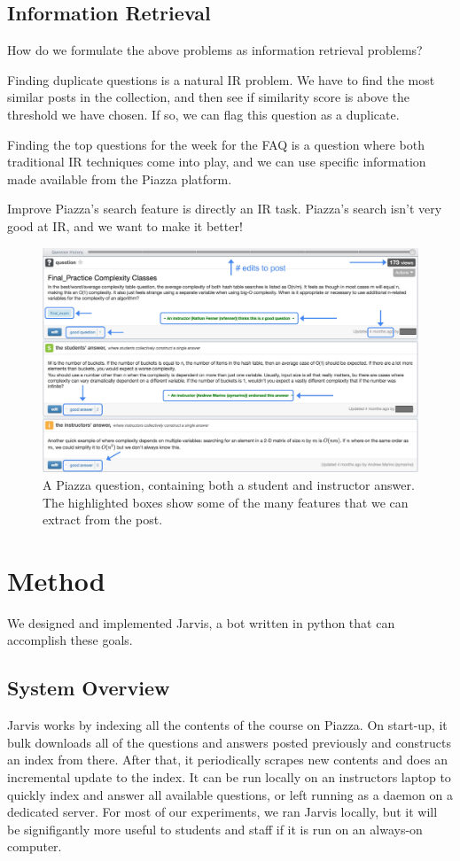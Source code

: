\documentclass[sigconf]{acmart}
\begin{document}
\subsection{Information Retrieval}
How do we formulate the above problems as information retrieval problems?

Finding duplicate questions is a natural IR problem. We have to find the most similar posts in the collection, and then see if similarity score is above the threshold we have chosen. If so, we can flag this question as a duplicate.

Finding the top questions for the week for the FAQ is a question where both traditional IR techniques come into play, and we can use specific information made available from the Piazza platform.

Improve Piazza's search feature is directly an IR task. Piazza's search isn't very good at IR, and we want to make it better!

\begin{figure}
\includegraphics[width=\textwidth]{piazza_stats}
\caption{A Piazza question, containing both a student and instructor answer. The highlighted boxes show some of the many features that we can extract from the post.}
\end{figure}

\section{Method}
We designed and implemented Jarvis, a bot written in python that can accomplish these goals. 

\subsection{System Overview}
Jarvis works by indexing all the contents of the course on Piazza. On start-up, it bulk downloads all of the questions and answers posted previously and constructs an index from there. After that, it periodically scrapes new contents and does an incremental update to the index. It can be run locally on an instructors laptop to quickly index and answer all available questions, or left running as a daemon on a dedicated server. For most of our experiments, we ran Jarvis locally, but it will be signifigantly more useful to students and staff if it is run on an always-on computer.
\end{document}
